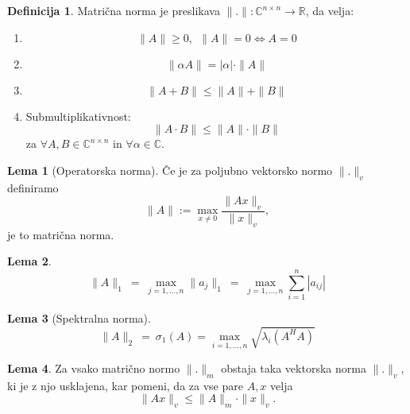\documentclass[11pt]{article}
\theoremstyle{definition}
\newtheorem{definicija}{Definicija}[section]
\newtheorem{lema}{Lema}
\begin{document}
\begin{definicija}

Matrična norma je preslikava $\|.\|: \mathbb{C}^{n \times n} \rightarrow \mathbb{R}$, da velja:
\begin{enumerate}
	\item[1)] $$\|A\| \geq 0, ~~\|A\| = 0 \Leftrightarrow A = 0$$
	\item[2)] $$\|\alpha A\| = |\alpha| \cdot \|A\|$$
	\item[3)] $$\|A + B\| \leq \|A\| + \|B\|$$
	\item[4)] Submultiplikativnost:
	$$\|A \cdot B\| \leq \|A\| \cdot \|B\|$$
	za $\forall A, B \in \mathbb{C}^{n \times n}$ in $\forall \alpha \in \mathbb{C}$.
\end{enumerate}

\end{definicija}
\vspace{0.5cm}

\begin{lema}[Operatorska norma]

Če je za poljubno vektorsko normo $\|.\|_v$ definiramo 
$$\|A\| := \max_{x \neq 0} \frac{\|Ax\|_v}{\|x\|_v},$$
je to matrična norma.

\end{lema}
\vspace{0.5cm}

\begin{lema}

$$\|A\|_1 ~=~ \max_{j = 1, \ldots, n} \|a_j\|_1 ~=~ \max_{j = 1, \ldots, n} \sum_{i=1}^n |a_{ij}|$$

\end{lema}
\vspace{0.5cm}

\begin{lema}[Spektralna norma]

$$\|A\|_2 ~=~ \sigma_1 (A) = \max_{i = 1, \ldots, n} \sqrt{\lambda_i (A^H A)}$$

\end{lema}
\vspace{0.5cm}

\begin{lema}

Za vsako matrično normo $\|.\|_m$ obstaja taka vektorska norma $\|.\|_v$, ki je z njo usklajena, kar pomeni, da za vse pare $A, x$ velja
$$\|A x\|_v \leq \|A\|_m \cdot \|x\|_v.$$

\end{lema}
\vspace{0.5cm}
\end{document}
